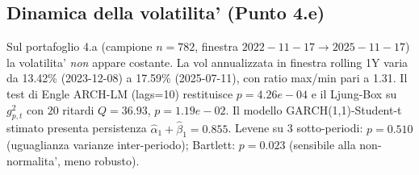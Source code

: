
\subsection*{Dinamica della volatilita' (Punto 4.e)}
Sul portafoglio 4.a (campione $n=782$, finestra $2022-11-17 \to 2025-11-17$) la
volatilita' \emph{non} appare costante. La vol annualizzata in finestra rolling 1Y varia da
13.42\% (2023-12-08) a 17.59\% (2025-07-11), con ratio max/min pari a
1.31. Il test di Engle ARCH-LM (lags=10) restituisce
$p=4.26e-04$ e il Ljung-Box su $g_{p,t}^2$ con $20$ ritardi
$Q=36.93$, $p=1.19e-02$. Il modello
GARCH(1,1)-Student-t stimato presenta persistenza
$\hat\alpha_1+\hat\beta_1=0.855$.
Levene su 3 sotto-periodi: $p=0.510$ (uguaglianza varianze
inter-periodo); Bartlett: $p=0.023$ (sensibile alla non-normalita', meno robusto).
